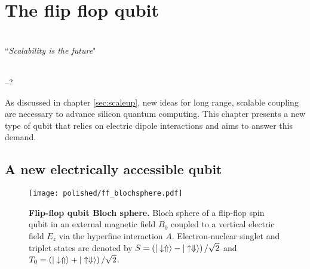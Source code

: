 
\chapter{The flip flop qubit} %

\label{Chapter2} %

\HRule
\vspace{0.5cm} \hspace{2cm}
\small
\hangindent=4cm
\\
        ``\emph{Scalability is the future}"
\\ \\
\hangindent=4cm
\begin{flushright}
--? \\
\end{flushright}

\vspace{0.5cm}

\noindent \HRule
\clearpage

As discussed in chapter \ref{sec:scaleup}, new ideas for long range, scalable coupling are necessary to advance silicon quantum computing. This chapter presents a new type of qubit that relies on electric dipole interactions and aims to answer this demand. 

\section{A new electrically accessible qubit}

\begin{figure}[h]
	\centering
	\texttt{[image: polished/ff\_blochsphere.pdf]}
	\caption[Flip-flop qubit Bloch sphere]{\textbf{Flip-flop qubit Bloch sphere.} Bloch sphere of a flip-flop spin qubit in an external magnetic field $B_0$ coupled to a vertical electric field $E_z$ via the hyperfine interaction $A$. Electron-nuclear singlet and triplet states are denoted by $S=\left(|\downarrow\Uparrow\rangle-|\uparrow\Downarrow\rangle\right)/\sqrt{2}$ and $T_0=\left(|\downarrow\Uparrow\rangle+|\uparrow\Downarrow\rangle\right)/\sqrt{2}$.}
	\label{fig:ff_blochsphere}
\end{figure}

